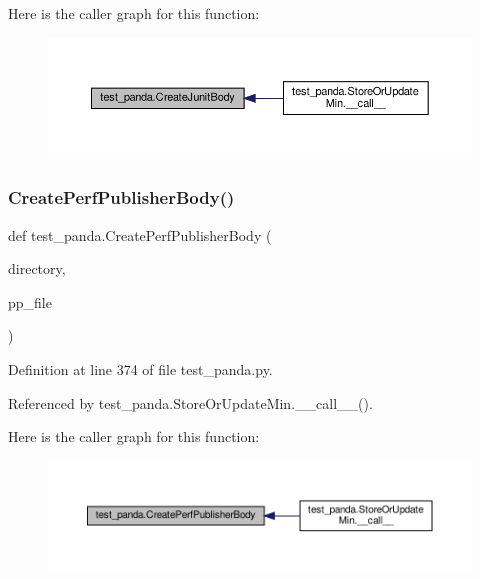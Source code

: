 Here is the caller graph for this function\+:
\nopagebreak
\begin{figure}[H]
\begin{center}
\leavevmode
\includegraphics[width=350pt]{d0/dee/namespacetest__panda_a6844f5381f9afc285b33efc892f3befb_icgraph}
\end{center}
\end{figure}
\mbox{\label{namespacetest__panda_a767af579398d78218e98aea5acbacf88}} 
\subsubsection{\texorpdfstring{Create\+Perf\+Publisher\+Body()}{CreatePerfPublisherBody()}}
{\footnotesize\ttfamily def test\+\_\+panda.\+Create\+Perf\+Publisher\+Body (\begin{DoxyParamCaption}\item[{}]{directory,  }\item[{}]{pp\+\_\+file }\end{DoxyParamCaption})}



Definition at line 374 of file test\+\_\+panda.\+py.



Referenced by test\+\_\+panda.\+Store\+Or\+Update\+Min.\+\_\+\+\_\+call\+\_\+\+\_\+().

Here is the caller graph for this function\+:
\nopagebreak
\begin{figure}[H]
\begin{center}
\leavevmode
\includegraphics[width=350pt]{d0/dee/namespacetest__panda_a767af579398d78218e98aea5acbacf88_icgraph}
\end{center}
\end{figure}
\mbox{\label{namespacetest__panda_a141cf457e8422fb7cf53f38d87b8a3b2}} 
